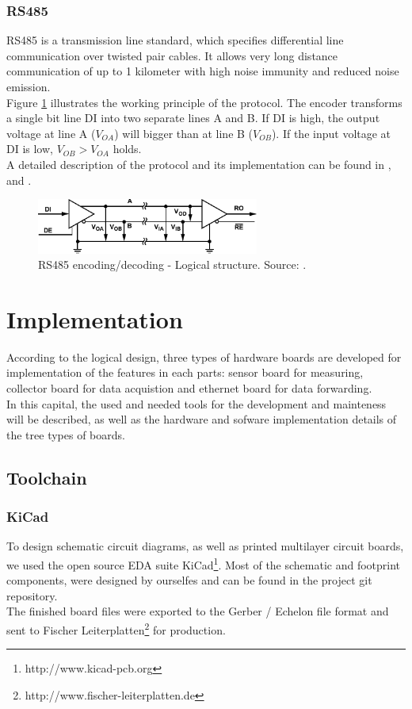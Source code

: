 \documentclass[a4paper]{scrreprt}
\begin{document}
\subsection{RS485}
RS485 is a transmission line standard, which specifies differential line communication over twisted pair cables.
It allows very long distance communication of up to 1 kilometer with high noise immunity and reduced noise emission.\\
Figure \ref{fig:rs485} illustrates the working principle of the protocol.
The encoder transforms a single bit line DI into two separate lines A and B.
If DI is high, the output voltage at line A ($V_{OA}$) will bigger than at line B ($V_{OB}$).
If the input voltage at DI is low, $V_{OB}>V_{OA}$ holds.\\
A detailed description of the protocol and its implementation can be found in \cite{rs485}, \cite{st485} and \cite{st485appnote}.
\null
\vfill
\begin{figure}[htbp]
	\centering
	\includegraphics[width=0.65\textwidth]{img/rs485.pdf}
  \caption{RS485 encoding/decoding - Logical structure. Source: \cite{rs485}.}
	\label{fig:rs485}
\end{figure}

\chapter{Implementation}
According to the logical design, three types of hardware boards are developed for implementation of the features in each parts: sensor board for measuring, collector board for data acquistion and ethernet board for data forwarding.\\
In this capital, the used and needed tools for the development and mainteness will be described, as well as the hardware and sofware implementation details of the tree types of boards.
\section{Toolchain}
\subsection{KiCad}
To design schematic circuit diagrams, as well as printed multilayer circuit boards, we used the open source EDA suite KiCad\footnote{http://www.kicad-pcb.org}. Most of the schematic and footprint components, were designed by ourselfes and can be found in the project git repository.\\
The finished board files were exported to the Gerber / Echelon file format and sent to Fischer Leiterplatten\footnote{http://www.fischer-leiterplatten.de} for production.
\end{document}
